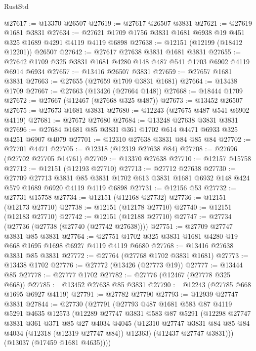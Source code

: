 \begin{lexlean}{RustStd}
\begin{coremodule}
@27617 := @13370 @26507
@27619 := @27617 @26507 @3831
@27621 := @27619 @1681 @3831
@27634 := @27621 @1709 @1756 @3831 @1681 @6938 @19 @451 @325 @1689 @4291 @4119 @4119 @6898
@27638 := @12151 (@12199 (@18412 @12201)) @26507
@27642 := @27617 @27638 @3831 @1681 @3831
@27655 := @27642 @1709 @325 @3831 @1681 @4280 @148 @487 @541 @1703 @6902 @4119 @6914 @6934
@27657 := @13416 @26507 @3831
@27659 := @27657 @1681 @3831
@27663 := @27655 (@27659 @1709 @3831 @1681)
@27664 := @13438 @1709
@27667 := @27663 (@13426 (@27664 @148))
@27668 := @18444 @1709
@27672 := @27667 (@12467 (@27668 @325 @487))
@27673 := @13452 @26507
@27675 := @27673 @1681 @3831
@27680 := @12243 (@27675 @487 @541 @6902 @4119)
@27681 := @27672 @27680
@27684 := @13248 @27638 @3831 @3831
@27696 := @27684 @1681 @85 @3831 @361 @1702 @614 @4471 @6933 @325 @4251 @6907 @4079
@27701 := @12310 @27638 @3831 @84 @85 @84
@27702 := @27701 @4471
@27705 := @12318 (@12319 @27638 @84)
@27708 := @27696 (@27702 @27705 @14761)
@27709 := @13370 @27638
@27710 := @12157 @15758
@27712 := @12151 (@12193 @27710)
@27713 := @27712 @27638
@27730 := @27709
    @27713
    @3831
    @85
    @3831
    @1702
    @613
    @3831
    @1681
    @6932
    @148
    @424
    @579
    @1689
    @6920
    @4119
    @4119
    @6898
@27731 := @12156 @53
@27732 := @27731 @15758
@27734 := @12151 (@12168 @27732)
@27736 := @12151 (@12173 @27710)
@27738 := @12151 (@12178 @27710)
@27740 := @12151 (@12183 @27710)
@27742 := @12151 (@12188 @27710)
@27747 := @27734 (@27736 (@27738 (@27740 (@27742 @27638))))
@27751 := @27709 @27747 @3831 @85 @3831
@27764 := @27751 @1702 @325 @3831 @1681 @4280 @19 @668 @1695 @1698 @6927 @4119 @4119 @6680
@27768 := @13416 @27638 @3831 @85 @3831
@27772 := @27764 (@27768 @1702 @3831 @1681)
@27773 := @13438 @1702
@27776 := @27772 (@13426 (@27773 @19))
@27777 := @13444 @85
@27778 := @27777 @1702
@27782 := @27776 (@12467 (@27778 @325 @668))
@27785 := @13452 @27638 @85 @3831
@27790 := @12243 (@27785 @668 @1695 @6927 @4119)
@27791 := @27782 @27790
@27793 := @12939 @27747 @3831
@27844 := @27730
    (@27791
      (@27793
        @487
        @1681
        @583
        @87
        @4119
        @5291
        @4635
        @12573
        (@12289
          @27747
          @3831
          @583
          @87
          @5291
          (@12298
            @27747
            @3831
            @361
            @371
            @85
            @27
            @4034
            @4045
            (@12310 @27747 @3831 @84 @85 @84 @4034 (@12318 (@12319 @27747 @84)) @12363)
            (@12437 @27747 @3831)))
        (@13037 (@17459 @1681 @4635))))

\end{coremodule}
\end{lexlean}
